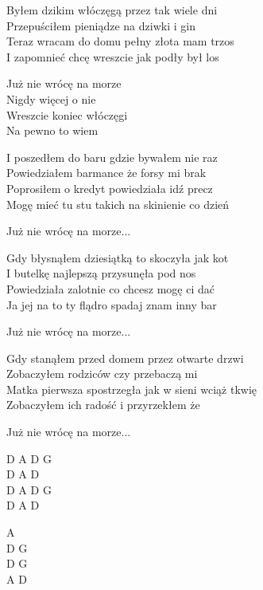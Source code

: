 \begin{text}

    Byłem dzikim włóczęgą przez tak wiele dni\\
    Przepuściłem pieniądze na dziwki i gin\\
    Teraz wracam do domu pełny złota mam trzos\\
    I zapomnieć chcę wreszcie jak podły był los

    \vin Już nie wrócę na morze\\
    \vin Nigdy więcej o nie\\
    \vin Wreszcie koniec włóczęgi\\
    \vin Na pewno to wiem

    I poszedłem do baru gdzie bywałem nie raz\\
    Powiedziałem barmance że forsy mi brak\\
    Poprosiłem o kredyt powiedziała idź precz\\
    Mogę mieć tu stu takich na skinienie co dzień

    \vin Już nie wrócę na morze...

    Gdy błysnąłem dziesiątką to skoczyła jak kot\\
    I butelkę najlepszą przysunęła pod nos\\
    Powiedziała zalotnie co chcesz mogę ci dać\\
    Ja jej na to ty flądro spadaj znam inny bar

    \vin Już nie wrócę na morze...

    Gdy stanąłem przed domem przez otwarte drzwi\\
    Zobaczyłem rodziców czy przebaczą mi\\
    Matka pierwsza spostrzegła jak w sieni wciąż tkwię\\
    Zobaczyłem ich radość i przyrzekłem że

    \vin Już nie wrócę na morze...

\end{text}
\begin{chord}
    D A D G\\
    D A D\\
    D A D G\\
    D A D

    A\\
    D G\\
    D G\\
    A D
\end{chord}
